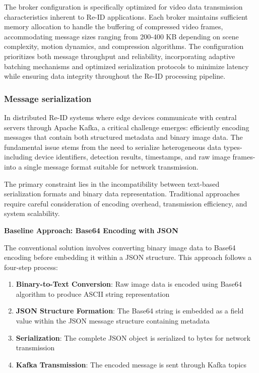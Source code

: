 The broker configuration is specifically optimized for video data transmission characteristics inherent to Re-ID applications. Each broker maintains sufficient memory allocation to handle the buffering of compressed video frames, accommodating message sizes ranging from 200-400 KB depending on scene complexity, motion dynamics, and compression algorithms. The configuration prioritizes both message throughput and reliability, incorporating adaptive batching mechanisms and optimized serialization protocols to minimize latency while ensuring data integrity throughout the Re-ID processing pipeline.

\subsubsection{Message serialization}
\label{sec:message_serialization}

In distributed Re-ID systems where edge devices communicate with central servers through Apache Kafka, a critical challenge emerges: efficiently encoding messages that contain both structured metadata and binary image data. The fundamental issue stems from the need to serialize heterogeneous data types-including device identifiers, detection results, timestamps, and raw image frames-into a single message format suitable for network transmission.

The primary constraint lies in the incompatibility between text-based serialization formats and binary data representation. Traditional approaches require careful consideration of encoding overhead, transmission efficiency, and system scalability.

\textbf{Baseline Approach: Base64 Encoding with JSON}

The conventional solution involves converting binary image data to Base64 encoding before embedding it within a JSON structure. This approach follows a four-step process:

\begin{enumerate}
    \item \textbf{Binary-to-Text Conversion}: Raw image data is encoded using Base64 algorithm to produce ASCII string representation
    \item \textbf{JSON Structure Formation}: The Base64 string is embedded as a field value within the JSON message structure containing metadata
    \item \textbf{Serialization}: The complete JSON object is serialized to bytes for network transmission
    \item \textbf{Kafka Transmission}: The encoded message is sent through Kafka topics
\end{enumerate}

